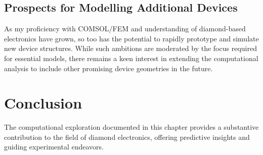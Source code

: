 \subsection{Prospects for Modelling Additional Devices}
As my proficiency with COMSOL/FEM and understanding of diamond-based electronics have grown, so too has the potential to rapidly prototype and simulate new device structures. While such ambitions are moderated by the focus required for essential models, there remains a keen interest in extending the computational analysis to include other promising device geometries in the future.

\section{Conclusion}
The computational exploration documented in this chapter provides a substantive contribution to the field of diamond electronics, offering predictive insights and guiding experimental endeavors.
